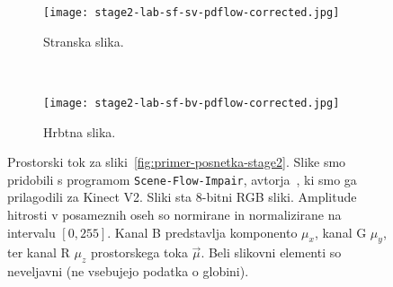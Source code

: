 \begin{figure}[!htb]
	\centering
	\begin{subfigure}[t]{0.45\columnwidth}
		\centering
		\texttt{[image: stage2-lab-sf-sv-pdflow-corrected.jpg]}
		\caption{Stranska slika.}
	\end{subfigure}
	~
	\begin{subfigure}[t]{0.45\columnwidth}
		\centering
		\texttt{[image: stage2-lab-sf-bv-pdflow-corrected.jpg]}
		\caption{Hrbtna slika.}
	\end{subfigure}
	\caption[Prostorski tok za sliki~\ref{fig:primer-posnetka-stage2}]{Prostorski tok za sliki~\ref{fig:primer-posnetka-stage2}. Slike smo pridobili s programom \texttt{Scene-Flow-Impair}, avtorja~\cite{jaimez2015primal}, ki smo ga prilagodili za Kinect V2. Sliki sta 8-bitni RGB sliki. Amplitude hitrosti v posameznih oseh so normirane in normalizirane na intervalu $[0,255]$. Kanal B predstavlja komponento $\mu_x$, kanal G $\mu_y$, ter kanal R $\mu_z$ prostorskega toka $\vec{\mu}$. Beli slikovni elementi so neveljavni (ne vsebujejo podatka o globini).}
	\label{fig:stage2-lab-sf-pd}
\end{figure}

